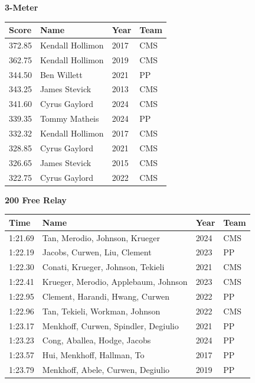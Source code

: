 \vspace{1.2em}
\noindent\begin{minipage}[t]{0.98\textwidth}
\centering
\textbf{\textcolor{teamprimary}{3-Meter}}\par
\vspace{0.5em}
\centering
\small
\renewcommand{\arraystretch}{1.0}
\setlength{\tabcolsep}{4pt}
\begin{tabular}{@{}p{2.5cm}p{4.5cm}p{1.5cm}p{2.5cm}@{}}
\toprule
\textbf{Score} & \textbf{Name} & \textbf{Year} & \textbf{Team} \\
\midrule
372.85 & Kendall Hollimon & 2017 & CMS \\
362.75 & Kendall Hollimon & 2019 & CMS \\
344.50 & Ben Willett & 2021 & PP \\
343.25 & James Stevick & 2013 & CMS \\
341.60 & Cyrus Gaylord & 2024 & CMS \\
339.35 & Tommy Matheis & 2024 & PP \\
332.32 & Kendall Hollimon & 2017 & CMS \\
328.85 & Cyrus Gaylord & 2021 & CMS \\
326.65 & James Stevick & 2015 & CMS \\
322.75 & Cyrus Gaylord & 2022 & CMS \\
\bottomrule
\end{tabular}
\end{minipage}
\vspace{1.2em}
\noindent\begin{minipage}[t]{0.98\textwidth}
\centering
\textbf{\textcolor{teamprimary}{200 Free Relay}}\par
\vspace{0.5em}
\centering
\small
\renewcommand{\arraystretch}{1.0}
\setlength{\tabcolsep}{4pt}
\begin{tabular}{@{}p{2.7cm}p{4.3cm}p{1.6cm}p{2.7cm}@{}}
\toprule
\textbf{Time} & \textbf{Name} & \textbf{Year} & \textbf{Team} \\
\midrule
1:21.69 & Tan, Merodio, Johnson, Krueger & 2024 & CMS \\
1:22.19 & Jacobs, Curwen, Liu, Clement & 2023 & PP \\
1:22.30 & Conati, Krueger, Johnson, Tekieli & 2021 & CMS \\
1:22.41 & Krueger, Merodio, Applebaum, Johnson & 2023 & CMS \\
1:22.95 & Clement, Harandi, Hwang, Curwen & 2022 & PP \\
1:22.96 & Tan, Tekieli, Workman, Johnson & 2022 & CMS \\
1:23.17 & Menkhoff, Curwen, Spindler, Degiulio & 2021 & PP \\
1:23.23 & Cong, Aballea, Hodge, Jacobs & 2024 & PP \\
1:23.57 & Hui, Menkhoff, Hallman, To & 2017 & PP \\
1:23.79 & Menkhoff, Abele, Curwen, Degiulio & 2019 & PP \\
\bottomrule
\end{tabular}
\end{minipage}
